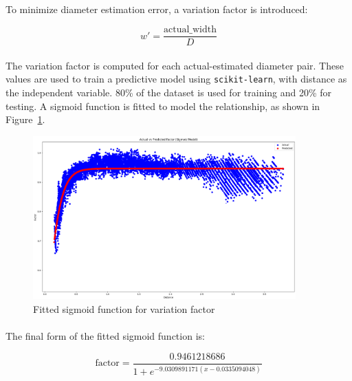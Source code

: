 \paragraph*{}
To minimize diameter estimation error, a variation factor is introduced:

\begin{equation}
w' = \frac{\text{actual\_width}}{D}
\label{eq:calculate variation factor}
\end{equation}

\paragraph*{}
The variation factor is computed for each actual-estimated diameter pair. These values are used to train a predictive model using \texttt{scikit-learn}, with distance as the independent variable. 80\% of the dataset is used for training and 20\% for testing. A sigmoid function is fitted to model the relationship, as shown in Figure~\ref{fig:sigmoid}.

\begin{figure}[H]
    \centering
    \includegraphics[width=0.9\textwidth]{assets/images/object_detection/fig4.png}
    \caption{Fitted sigmoid function for variation factor}
    \label{fig:sigmoid}
\end{figure}

\paragraph*{}
The final form of the fitted sigmoid function is:

\begin{equation}
\text{factor} = \frac{0.9461218686}{1 + e^{-9.0309891171(x - 0.0335094048)}}
\label{eq:fitted sigmoid}
\end{equation}

